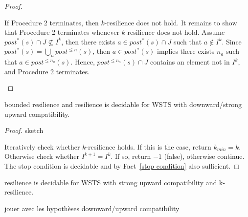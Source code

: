 \begin{proof}
\begin{enumerate}
If Procedure 2 terminates, then
$k$-resilience does not hold.
It remains to show that Procedure 2 terminates whenever $k$-resilience does not hold.
Assume $ post^*(s) \cap J \not\subseteq I^k$, then there exists $a \in post^*(s) \cap J$ such that $a \not\in I^k$. Since $post^*(s) = \bigcup_{n} post^{\leq n}(s)$, then 
$a \in post^*(s)$
implies
there exists
$n_a$
such that
$a \in post^{\leq n_a}(s)$.
Hence,  $post^{\leq n_a}(s) \cap J$ contains an element not in 
$I^k$,
and Procedure 2 terminates.
\end{enumerate}

\end{proof}



\begin{theorem}
{\sc bounded resilience} and {\sc resilience} is decidable for WSTS with downward/strong upward compatibility.
\end{theorem}

\begin{proof}{sketch}

Iteratively check whether $k$-resilience holds. 
If this is the case, return $k_{min} = k$. Otherwise check whether 
$I^{k+1} = I^k$. If so, return $-1$ (false), otherwise
continue.
The stop condition is decidable
and by Fact~\ref{stop condition} also sufficient. 
\end{proof}

{\sc resilience} is decidable for WSTS with strong upward compatibility and k-resilience.

jouer avec les hypothèses downward/upward compatibility


